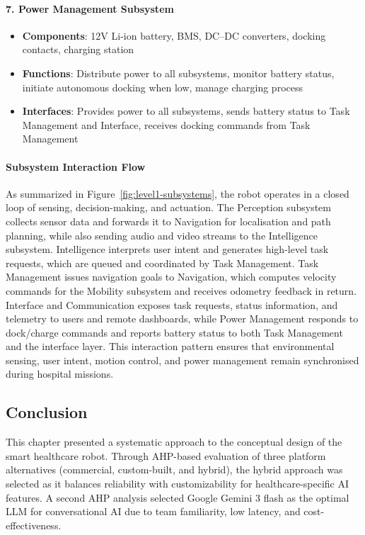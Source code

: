 \paragraph{7. Power Management Subsystem}
\begin{itemize}
    \item \textbf{Components}: 12V Li-ion battery, BMS, DC--DC converters, docking contacts, charging station
    \item \textbf{Functions}: Distribute power to all subsystems, monitor battery status, initiate autonomous docking when low, manage charging process
    \item \textbf{Interfaces}: Provides power to all subsystems, sends battery status to Task Management and Interface, receives docking commands from Task Management
\end{itemize}

\paragraph{Subsystem Interaction Flow}
As summarized in Figure~\ref{fig:level1-subsystems}, the robot operates in a closed loop of sensing, decision-making, and actuation. The Perception subsystem collects sensor data and forwards it to Navigation for localisation and path planning, while also sending audio and video streams to the Intelligence subsystem. Intelligence interprets user intent and generates high-level task requests, which are queued and coordinated by Task Management. Task Management issues navigation goals to Navigation, which computes velocity commands for the Mobility subsystem and receives odometry feedback in return. Interface and Communication exposes task requests, status information, and telemetry to users and remote dashboards, while Power Management responds to dock/charge commands and reports battery status to both Task Management and the interface layer. This interaction pattern ensures that environmental sensing, user intent, motion control, and power management remain synchronised during hospital missions.

\subsection{Conclusion}
This chapter presented a systematic approach to the conceptual design of the smart healthcare robot. Through AHP-based evaluation of three platform alternatives (commercial, custom-built, and hybrid), the hybrid approach was selected as it balances reliability with customizability for healthcare-specific AI features. A second AHP analysis selected Google Gemini 3 flash as the optimal LLM for conversational AI due to team familiarity, low latency, and cost-effectiveness.

